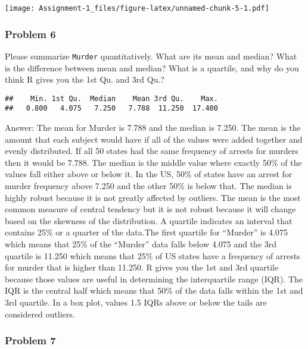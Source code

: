 \documentclass[
]{article}
\newenvironment{Shaded}{\begin{snugshade}}{\end{snugshade}}
\newcommand{\FunctionTok}[1]{\textcolor[rgb]{0.00,0.00,0.00}{#1}}
\newcommand{\NormalTok}[1]{#1}
\newcommand{\SpecialCharTok}[1]{\textcolor[rgb]{0.00,0.00,0.00}{#1}}
\begin{document}
\texttt{[image: Assignment-1\_files/figure-latex/unnamed-chunk-5-1.pdf]}

\hypertarget{problem-6}{%
\subsubsection{Problem 6}\label{problem-6}}

Please summarize \texttt{Murder} quantitatively. What are its mean and
median? What is the difference between mean and median? What is a
quartile, and why do you think R gives you the 1st Qu. and 3rd Qu.?

\begin{Shaded}
\end{Shaded}

\begin{verbatim}
##    Min. 1st Qu.  Median    Mean 3rd Qu.    Max. 
##   0.800   4.075   7.250   7.788  11.250  17.400
\end{verbatim}

Answer: The mean for Murder is 7.788 and the median is 7.250. The mean
is the amount that each subject would have if all of the values were
added together and evenly distributed. If all 50 states had the same
frequency of arrests for murders then it would be 7.788. The median is
the middle value where exactly 50\% of the values fall either above or
below it. In the US, 50\% of states have an arrest for murder frequency
above 7.250 and the other 50\% is below that. The median is highly
robust because it is not greatly affected by outliers. The mean is the
most common measure of central tendency but it is not robust because it
will change based on the skewness of the distribution. A quartile
indicates an interval that contains 25\% or a quarter of the data.The
first quartile for ``Murder'' is 4.075 which means that 25\% of the
``Murder'' data falls below 4.075 and the 3rd quartile is 11.250 which
means that 25\% of US states have a frequency of arrests for murder that
is higher than 11.250. R gives you the 1st and 3rd quartile because
those values are useful in determining the interquartile range (IQR).
The IQR is the central half which means that 50\% of the data falls
within the 1st and 3rd quartile. In a box plot, values 1.5 IQRs above or
below the tails are considered outliers.

\hypertarget{problem-7}{%
\subsubsection{Problem 7}\label{problem-7}}
\end{document}
